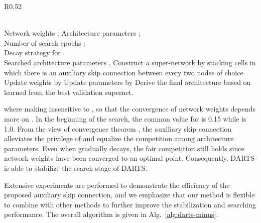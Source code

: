 \documentclass{article} \usepackage{iclr2021_conference,times}
\begin{document}
\begin{wrapfigure}[17]{R}{0.52\textwidth}
\vspace{-22pt}
 \begin{minipage}{0.52\textwidth}
\begin{algorithm}[H]
	\caption{DARTS-}
	\label{alg:darts-minus}
	\begin{algorithmic}[1]
		\REQUIRE~~\\
		Network weights ; Architecture parameters ;  \\
		Number of search epochs ; \\
		Decay strategy for .
                \ENSURE ~~\\
                Searched architecture parameters .
\STATE Construct a super-network by stacking cells in which there is an auxiliary skip connection between every two nodes of choice
		\STATE Update weights  by  
		\STATE Update parameters   by  
		\ENDFOR
\STATE Derive the final architecture based on learned  from the best validation supernet.
	\end{algorithmic}
\end{algorithm}
\end{minipage}
\end{wrapfigure}
where  making  insensitive to , so that the convergence of network weights  depends more on . In the beginning of the search,  the common value for  is 0.15 while  is 1.0. From the view of convergence theorem \citep{zhou2020theory}, the auxiliary skip connection alleviates the privilege of  and equalize the competition among architecture parameters. Even when  gradually decays, the fair competition still holds since network weights  have been converged to an optimal point. Consequently, DARTS- is able to stabilize the search stage of DARTS. 

Extensive experiments are performed to demonstrate the efficiency of the proposed auxiliary skip connection, and we emphasize that our method is flexible to combine with other methods to further improve the stabilization and searching performance. The overall algorithm is given in Alg.~\ref{alg:darts-minus}.
\end{document}
